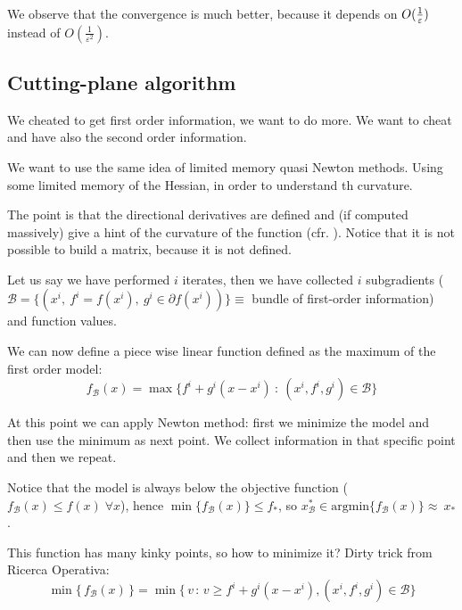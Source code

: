 \documentclass[ComputationalMathematics.tex]{subfiles}
\begin{document}
We observe that the convergence is much better, because it depends on $O(\frac{1}{\varepsilon})$ instead of $O(\frac{1}{\varepsilon^2})$.


\subsection{Cutting-plane algorithm}
We cheated to get first order information, we want to do more. We want to cheat and have also the second order information.

We want to use the same idea of limited memory quasi Newton methods. Using some limited memory of the Hessian, in order to understand th curvature.

The point is that the directional derivatives are defined and (if computed massively) give a hint of the curvature of the function (cfr. ).
Notice that it is not possible to build a matrix, because it is not defined.


Let us say we have performed $i$ iterates, then we have collected $i$ subgradients ($\mathscr{B} = \{(x^i,~f^i = f(x^i),~g^i \in \partial f(x^i))\} \equiv$ bundle of first-order information) and function values.

We can now define a piece wise linear function defined as the maximum of the first order model:
\[
  f_{\mathscr{B}}(x) = \max \{f^i + g^i (x - x^i)~:~(x^i, f^i, g^i) \in \mathscr{B}\}
\]

At this point we can apply Newton method: first we minimize the model and then use the minimum as next point. We collect information in that specific point and then we repeat.

 Notice that the model is always below the objective function ($f_{\mathscr{B}}(x) \leq f(x) \; \forall x$), hence $\min \{f_{\mathscr{B}}(x)\} \leq f_*$, so $x^*_{\mathscr{B}} \in \mbox{argmin} \{f_{\mathscr{B}}(x) \} \approx~x_*$.

 This function has many kinky points, so how to minimize it?
Dirty trick from Ricerca Operativa: 
\[
  \min \{ \, f_{\mathscr{B}}(x) \, \} = \min \{ \, v \,:\, v \geq f^i + g^i (x - x^i), (x^i,f^i,g^i) \in \mathscr{B}\}
\]
\end{document}
